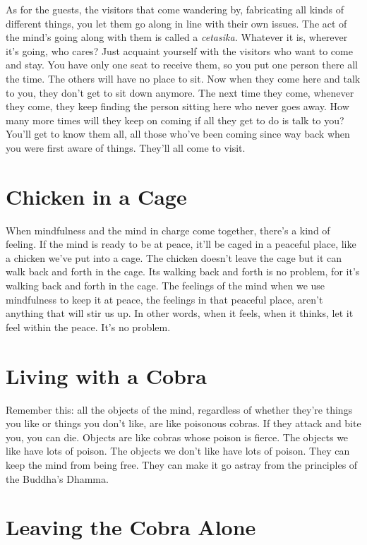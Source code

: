 As for the guests, the visitors that come wandering by, fabricating all kinds of different things, you let them go along in line with their own issues. The act of the mind's going along with them is called a \textit{cetasika.} Whatever it is, wherever it's going, who cares? Just acquaint yourself with the visitors who want to come and stay. You have only one seat to receive them, so you put one person there all the time. The others will have no place to sit. Now when they come here and talk to you, they don't get to sit down anymore. The next time they come, whenever they come, they keep finding the person sitting here who never goes away. How many more times will they keep on coming if all they get to do is talk to you? You'll get to know them all, all those who've been coming since way back when you were first aware of things. They'll all come to visit.

\clearpage

\section{Chicken in a Cage}

When mindfulness and the mind in charge come together, there's a kind of feeling. If the mind is ready to be at peace, it'll be caged in a peaceful place, like a chicken we've put into a cage. The chicken doesn't leave the cage but it can walk back and forth in the cage. Its walking back and forth is no problem, for it's walking back and forth in the cage. The feelings of the mind when we use mindfulness to keep it at peace, the feelings in that peaceful place, aren't anything that will stir us up. In other words, when it feels, when it thinks, let it feel within the peace. It's no problem.

\section{Living with a Cobra}

Remember this: all the objects of the mind, regardless of whether they're things you like or things you don't like, are like poisonous cobras. If they attack and bite you, you can die. Objects are like cobras whose poison is fierce. The objects we like have lots of poison. The objects we don't like have lots of poison. They can keep the mind from being free. They can make it go astray from the principles of the Buddha's Dhamma.

\clearpage

\section{Leaving the Cobra Alone}

